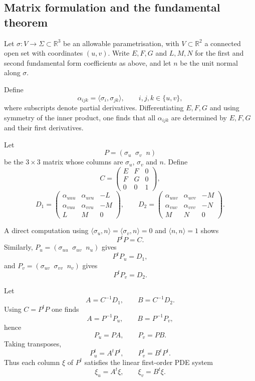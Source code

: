 \documentclass[12pt,a4paper]{article}
\theoremstyle{plain}
\theoremstyle{definition}      %
\begin{document}
\subsection{Matrix formulation and the fundamental theorem}

Let $\sigma:V\to\Sigma\subset\mathbb{R}^3$ be an allowable
parametrisation, with $V\subset\mathbb{R}^2$ a connected open set with
coordinates $(u,v)$.  Write $E,F,G$ and $L,M,N$ for the first and
second fundamental form coefficients as above, and let
$n$ be the unit normal along $\sigma$.

Define
\[
\alpha_{ijk}=\langle\sigma_i,\sigma_{jk}\rangle,\qquad i,j,k\in\{u,v\},
\]
where subscripts denote partial derivatives.  Differentiating $E,F,G$
and using symmetry of the inner product, one finds that all
$\alpha_{ijk}$ are determined by $E,F,G$ and their first derivatives.

Let
\[
P=(\sigma_u\;\;\sigma_v\;\;n)
\]
be the $3\times3$ matrix whose columns are $\sigma_u$, $\sigma_v$ and
$n$.  Define
\[
C=\begin{pmatrix}
	E & F & 0\\[2pt]
	F & G & 0\\[2pt]
	0 & 0 & 1
\end{pmatrix},
\]
\[
D_1=\begin{pmatrix}
	\alpha_{uuu} & \alpha_{uvu} & -L\\[2pt]
	\alpha_{vuu} & \alpha_{vvu} & -M\\[2pt]
	L & M & 0
\end{pmatrix},\qquad
D_2=\begin{pmatrix}
	\alpha_{uuv} & \alpha_{uvv} & -M\\[2pt]
	\alpha_{vuv} & \alpha_{vvv} & -N\\[2pt]
	M & N & 0
\end{pmatrix}.
\]

A direct computation using $\langle\sigma_u,n\rangle=
\langle\sigma_v,n\rangle=0$ and $\langle n,n\rangle=1$ shows
\[
P^tP=C.
\]
Similarly, $P_u=(\sigma_{uu}\;\;\sigma_{uv}\;\;n_u)$ gives
\[
P^tP_u = D_1,
\]
and $P_v=(\sigma_{uv}\;\;\sigma_{vv}\;\;n_v)$ gives
\[
P^tP_v = D_2.
\]

Let
\[
A=C^{-1}D_1,\qquad B=C^{-1}D_2.
\]
Using $C=P^tP$ one finds
\[
A = P^{-1}P_u,\qquad B=P^{-1}P_v,
\]
hence
\[
P_u = P A,\qquad P_v = P B.
\]
Taking transposes,
\[
P_u^t = A^tP^t,\qquad P_v^t = B^tP^t.
\]
Thus each column $\xi$ of $P^t$ satisfies the linear first-order PDE
system
\[
\xi_u = A^t\xi,\qquad \xi_v = B^t\xi.
\]
\end{document}

